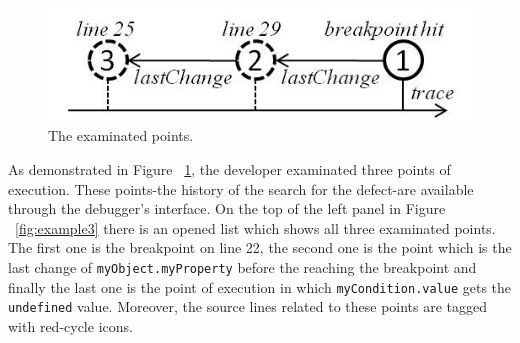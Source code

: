 \documentclass[preprint]{sigplanconf}
\begin{document}
\begin{figure}[htp]
\includegraphics{5-example-points.jpg}
\caption{The examinated points.}
\label{fig:example-points}
\end{figure}

As demonstrated in Figure ~\ref{fig:example-points}, the developer examinated three points of execution. These points-the history of the search for the defect-are available through the debugger's interface. On the top of the left panel in Figure ~\ref{fig:example3} there is an opened list which shows all three examinated points. The first one is the breakpoint on line 22, the second one is the point which is the last change of \texttt{myObject.myProperty} before the reaching the breakpoint and finally the last one is the point of execution in which \texttt{myCondition.value} gets the \texttt{undefined} value. Moreover, the source lines related to these points are tagged with red-cycle icons.
\end{document}
